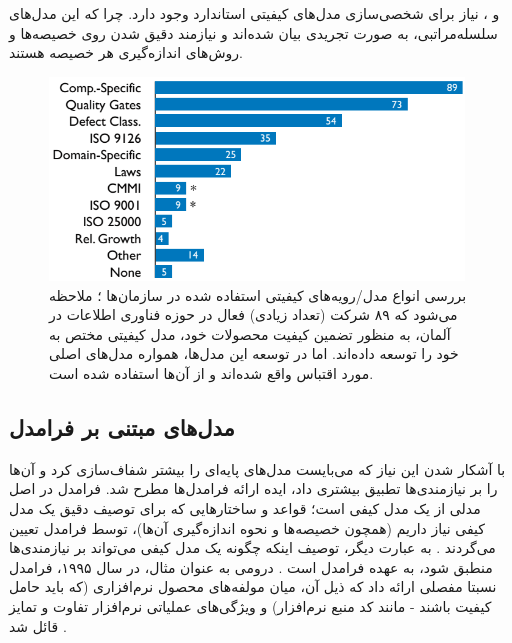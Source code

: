 \cite{pressman_software_2015} و
\cite{sommerville_software_2016}،
نیاز برای شخصی‌سازی مدل‌های کیفیتی استاندارد وجود دارد. چرا که این مدل‌های سلسله‌مراتبی، به صورت تجریدی بیان شده‌اند و نیازمند دقیق شدن روی خصیصه‌ها و روش‌های اندازه‌گیری هر خصیصه هستند.
\begin{figure}
	\centering\includegraphics[width=11cm]{Resources/wagner.PNG}
	\caption[بررسی انواع مدل‌ها/رویه‌های کیفیتی استفاده شده در سازمان‌ها]
	{بررسی انواع مدل/رویه‌های کیفیتی استفاده شده در سازمان‌ها
		\cite{wagner_software_2012}؛
		ملاحظه می‌شود که ۸۹ شرکت (تعداد زیادی) فعال در حوزه فناوری اطلاعات در آلمان، به منظور تضمین کیفیت محصولات خود، مدل کیفیتی مختص به خود را توسعه داده‌اند. اما در توسعه این مدل‌ها، همواره مدل‌های اصلی مورد اقتباس واقع شده‌اند و از آن‌ها استفاده شده است.
	}
	\label{fig:wagner}
\end{figure}
\subsection{مدل‌های مبتنی بر فرامدل}
با آشکار شدن این نیاز که می‌بایست مدل‌های پایه‌ای را بیشتر شفاف‌سازی کرد و آن‌ها را بر نیازمندی‌ها تطبیق بیشتری داد، ایده ارائه فرامدل‌ها مطرح شد. فرامدل در اصل مدلی از یک مدل کیفی است؛ قواعد و ساختارهایی که برای توصیف دقیق یک مدل کیفی نیاز داریم (همچون خصیصه‌ها و نحوه اندازه‌گیری آن‌ها)، توسط فرامدل تعیین می‌گردند
\cite{deissenboeck_software_2009}.
به عبارت دیگر، توصیف اینکه چگونه یک مدل کیفی می‌تواند بر نیازمندی‌ها منطبق شود، به عهده فرامدل است
\cite{wagner_software_2013}.
درومی به عنوان مثال، در سال ۱۹۹۵، فرامدل نسبتا مفصلی ارائه داد که ذیل آن، میان مولفه‌های محصول نرم‌افزاری (که باید حامل کیفیت باشند - مانند کد منبع نرم‌افزار) و ویژگی‌های عملیاتی نرم‌افزار تفاوت و تمایز قائل شد
\cite{dromey_model_1995}.
